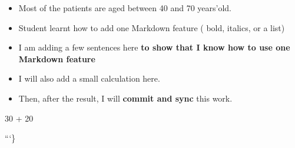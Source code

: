 \documentclass[
  letterpaper,
  DIV=11,
  numbers=noendperiod]{scrartcl}
\providecommand{\tightlist}{%
  \setlength{\itemsep}{0pt}\setlength{\parskip}{0pt}}
\begin{document}
\begin{itemize}
\tightlist
\item
  Most of the patients are aged between 40 and 70 years'old.
\item
  Student learnt how to add one Markdown feature ( bold, italics, or a
  list)
\item
  I am adding a few sentences here \textbf{to show that I know how to
  use one Markdown feature}
\item
  I will also add a small calculation here.
\item
  Then, after the result, I will \textbf{commit and sync} this work.
\end{itemize}

30 + 20

```\}
\end{document}
